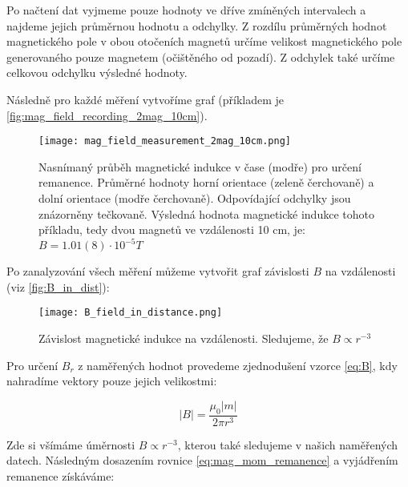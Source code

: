 Po načtení dat vyjmeme pouze hodnoty ve dříve zmíněných intervalech a najdeme jejich průměrnou hodnotu a odchylky.
Z rozdílu průměrných hodnot magnetického pole v obou otočeních magnetů určíme velikost magnetického pole generovaného pouze magnetem (očištěného od pozadí).
Z odchylek také určíme celkovou odchylku výsledné hodnoty.

Následně pro každé měření vytvoříme graf (příkladem je \autoref{fig:mag_field_recording_2mag_10cm}).



\begin{wrapfigure}{c}{1\textwidth}
    \texttt{[image: mag\_field\_measurement\_2mag\_10cm.png]}
    \centering
    \caption[Nasnímaný průběh magnetické indukce v čase pro účely měření remanence]{Nasnímaný průběh magnetické indukce v čase (modře) pro určení remanence. Průměrné hodnoty horní orientace (zeleně čerchovaně) a dolní orientace (modře čerchovaně). Odpovídající odchylky jsou znázorněny tečkovaně. Výsledná hodnota magnetické indukce tohoto příkladu, tedy dvou magnetů ve vzdálenosti 10 cm, je: $B = 1.01(8) \cdot 10^{-5} T$}
    \label{fig:mag_field_recording_2mag_10cm}
\end{wrapfigure}

\clearpage

Po zanalyzování všech měření můžeme vytvořit graf závislosti $B$ na vzdálenosti (viz \autoref{fig:B_in_dist}):

\begin{wrapfigure}{r}{0.5\textwidth}
    \vspace*{0.5cm}
    \texttt{[image: B\_field\_in\_distance.png]}
    \centering
    \caption[Závislost magnetické indukce na vzdálenosti]{Závislost magnetické indukce na vzdálenosti. Sledujeme, že $B \propto r^{-3}$}
    \label{fig:B_in_dist}
\end{wrapfigure}

Pro určení $B_r$ z naměřených hodnot provedeme zjednodušení vzorce \ref{eq:B}, kdy nahradíme vektory pouze jejich velikostmi:

\begin{equation}
    \label{eq:B_reduced}
    |B| = \frac{{\mu}_0 |m|}{2\pi r^3}
\end{equation}

Zde si všímáme úměrnosti $B \propto r^{-3}$, kterou také sledujeme v našich naměřených datech.
Následným dosazením rovnice \ref{eq:mag_mom_remanence} a vyjádřením remanence získáváme:

